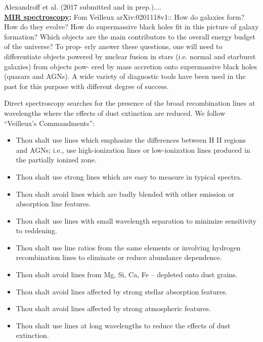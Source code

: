 \smallskip
\smallskip
\noindent
Alexandroff et al. (2017 submitted and in prep.).... \\



\medskip
\medskip
\smallskip
\smallskip
\noindent
{\bf \underline{MIR spectroscopy}:}
Fom Veilleux arXiv:0201118v1:: 
How do galaxies form? How do they evolve? How do supermassive black holes fit in this picture of galaxy formation? Which objects are the main contributors to the overall energy budget of the universe? To prop- erly answer these questions, one will need to differentiate objects powered by nuclear fusion in stars (i.e. normal and starburst galaxies) from objects pow- ered by mass accretion onto supermassive black holes (quasars and AGNs). A wide variety of diagnostic tools have been used in the past for this purpose with different degree of success.

Direct spectroscopy searches for the presence of the broad recombination lines at wavelengths where the effects of dust extinction are reduced.
We follow ``Veilleux's Commandments'':
\begin{itemize}
\item Thou shalt use lines which emphasize the differences between H II regions and AGNs; i.e., use high-ionization lines or low-ionization lines produced in the partially ionized zone. 
\item Thou shalt use strong lines which are easy to measure in typical spectra.
\item Thou shalt avoid lines which are badly blended with other emission or absorption line features.
\item Thou shalt use lines with small wavelength separation to minimize sensitivity to reddening.
\item Thou shalt use line ratios from the same elements or involving hydrogen recombination lines to eliminate or reduce abundance dependence.
\item Thou shalt avoid lines from Mg, Si, Ca, Fe – depleted onto dust grains. 
\item Thou shalt avoid lines affected by strong stellar absorption features. 
\item Thou shalt avoid lines affected by strong atmospheric features.
\item Thou shalt use lines at long wavelengths to reduce the effects of dust extinction.
\end{itemize}


